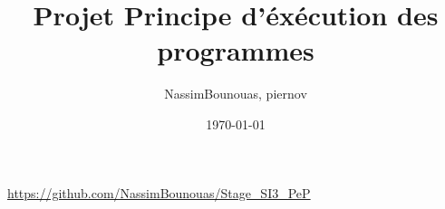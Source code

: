 \documentclass{article}
\title{Projet Principe d'éxécution des programmes}
\author{NassimBounouas, piernov}
\date{\today}
\begin{document}
\lstset{xleftmargin=.25in}

\maketitle
\textcolor{blue}{\url{https://github.com/NassimBounouas/Stage_SI3_PeP}}
\tableofcontents

\newpage









\end{document}
